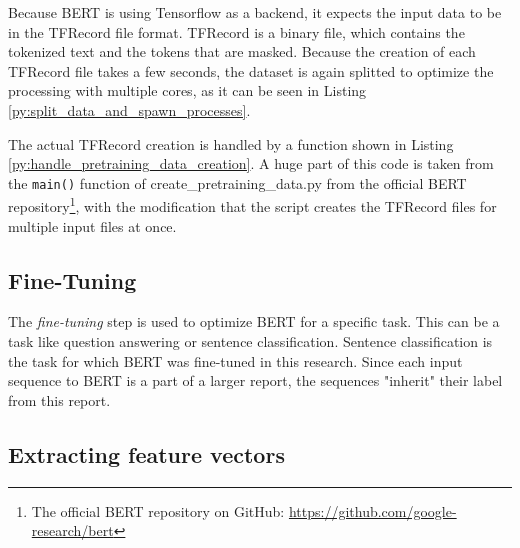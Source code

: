 Because \ac{BERT} is using Tensorflow as a backend, it expects the input data to be in the TFRecord file format.
TFRecord is a binary file, which contains the tokenized text and the tokens that are masked.
Because the creation of each TFRecord file takes a few seconds, the dataset is again splitted to optimize the processing with multiple cores, as it can be seen in Listing \ref{py:split_data_and_spawn_processes}.

The actual TFRecord creation is handled by a function shown in Listing \ref{py:handle_pretraining_data_creation}.
A huge part of this code is taken from the \texttt{main()} function of create\_pretraining\_data.py from the official \ac{BERT} repository\footnote{The official \ac{BERT} repository on GitHub: \url{https://github.com/google-research/bert}}, with the modification that the script creates the TFRecord files for multiple input files at once.


\subsection{Fine-Tuning}
The \textit{fine-tuning} step is used to optimize \ac{BERT} for a specific task.
This can be a task like question answering or sentence classification.
Sentence classification is the task for which \ac{BERT} was fine-tuned in this research.
Since each input sequence to \ac{BERT} is a part of a larger report, the sequences "inherit" their label from this report.

\subsection{Extracting feature vectors}